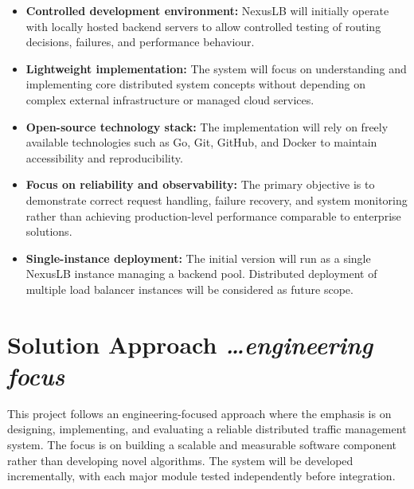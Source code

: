 \documentclass[11pt,a4paper]{article}
\newcommand{\BvrHint}[1]{%
  {\normalfont\normalsize\itshape\hfill #1}}
\begin{document}
\begin{itemize}
    \item \textbf{Controlled development environment:} NexusLB will initially operate with locally hosted backend servers to allow controlled testing of routing decisions, failures, and performance behaviour.

    \item \textbf{Lightweight implementation:} The system will focus on understanding and implementing core distributed system concepts without depending on complex external infrastructure or managed cloud services.

    \item \textbf{Open-source technology stack:} The implementation will rely on freely available technologies such as Go, Git, GitHub, and Docker to maintain accessibility and reproducibility.

    \item \textbf{Focus on reliability and observability:} The primary objective is to demonstrate correct request handling, failure recovery, and system monitoring rather than achieving production-level performance comparable to enterprise solutions.

    \item \textbf{Single-instance deployment:} The initial version will run as a single NexusLB instance managing a backend pool. Distributed deployment of multiple load balancer instances will be considered as future scope.
\end{itemize}

\section{Solution Approach %
\BvrHint{\ldots engineering focus}}

This project follows an engineering-focused approach where the emphasis is on designing, implementing, and evaluating a reliable distributed traffic management system. The focus is on building a scalable and measurable software component rather than developing novel algorithms. The system will be developed incrementally, with each major module tested independently before integration.
\end{document}
